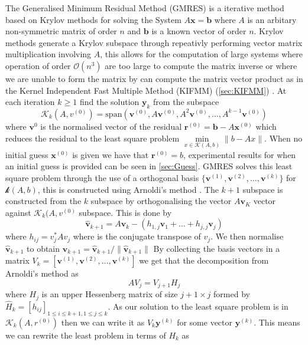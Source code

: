 The Generalised Minimum Residual Method (GMRES) \cite{Saad1986GMRES:Systems} is a iterative method based on Krylov methods for solving the System $A\bm{x}=\bm{b}$ where $A$ is an arbitary non-symmetric matrix of order $n$ and $\bm{b}$ is a known vector of order $n$. Krylov methods generate a Krylov subspace through repeativly performing vector matrix multiplication involving $A$, this allows for the computation of large systems where operation of order $\mathcal{O}(n^3)$ are too large to compute the matrix inverse or where we are unable to form the matrix by can compute the matrix vector product as in the Kernel Independent Fast Multiple Method (KIFMM) (\cref{sec:KIFMM}) \cite{Ipsen1998TheMethods}.
At each iteration $k \geq 1$ find the solution $\bm{y}_k$ from the subspace 
\begin{equation*}
    \mathcal{K}_k(A,v^{(0)}) = \text{span}(\bm{v}^{(0)},A\bm{v}^{(0)},A^2\bm{v}^{(0)},\dots,A^{k-1}\bm{v}^{(0)})
\end{equation*}
where $\bm{v}^{0}$ is the normalised vector of the residual $\bm{r}^{(0)}=\bm{b}-A\bm{x}^{(0)}$ which reduces the residual to the least square problem $\min\limits_{x\in\mathcal{K}(A,b)} \lVert b-Ax \rVert$. When no initial guess $\bm{x}^{(0)}$ is given we have that $\bm{r}^{(0)}=b$, experimental results for when an initial guess is provided can be seen in \cref{sec:Guess}. GMRES solves this least square problem through the use of a orthogonal basis $\{\bm{v}^{(1)},\bm{v}^{(2)},\dots,\bm{v}^{(k)}\}$ for $\mathcal{k}(A,b)$, this is constructed using Arnoldi's method \cite{Arnoldi1951TheProblem,Elman2005FiniteDynamics}. The $k+1$ subspace is constructed from the $k$ subspace by orthogonalising the vector $A\bm{v}_K$ vector against $\mathcal{K}_k(A,v^{(0)}$ subspace. This is done by
\begin{equation*}
    \bm{\hat{v}}_{k+1} = A\bm{v}_k - (h_{1,j}\bm{v}_1 + \dots + h_{j,j}\bm{v}_j)
\end{equation*}
where $h_{ij} = v_j^*Av_j$ where is the conjugate transpose of $v_j$. We then normalise $\bm{\hat{v}}_{k+1}$ to obtain $\bm{v}_{k+1}=\bm{\hat{v}}_{k+1}/\lVert \bm{\hat{v}}_{k+1} \rVert$
By collecting the basis vectors in a matrix $V_k = [\bm{v}^{(1)},\bm{v}^{(2)},\dots,\bm{v}^{(k)}]$ we get that the decomposition from Arnoldi's method as
\begin{equation*}
    AV_j = V_{j+1} H_j
\end{equation*}
 where $H_j$ is an upper Hessenberg matrix of size $j + 1\times j$ formed by $\hat{H}_k = [h_{ij}]_{1 \leq i \leq k+1, 1 \leq j \leq k}$. As our solution to the least square problem is in $\mathcal{K}_k(A,r^{(0)})$ then we can write it as $V_k\bm{y}^{(k)}$ for some vector $\bm{y}^{(k)}$. This means we can rewrite the least problem in terms of $H_k$ as
